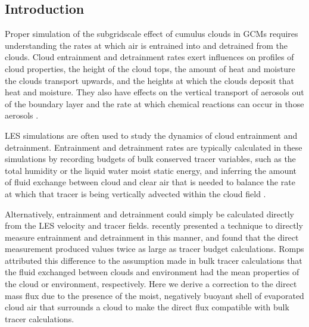 \documentclass[draft,grl]{AGUTeX}
\begin{document}
\begin{article}

%
%

\section{Introduction}

Proper simulation of the subgridscale effect of cumulus clouds in GCMs 
requires understanding the rates at which air is entrained into and detrained 
from the clouds. Cloud entrainment and detrainment rates exert influences on 
profiles of cloud properties, the height of the cloud tops, the amount of heat 
and moisture the clouds transport upwards, and the heights at which the clouds 
deposit that heat and moisture.  They also have effects on the vertical 
transport of aerosols out of the boundary layer and the rate at which 
chemical reactions can occur in those aerosols 
\citep{Barahona2007,Anldrejczuk2008}. 

LES simulations are often used to study the dynamics of cloud entrainment and 
detrainment.  Entrainment and detrainment rates are typically calculated in 
these simulations by recording budgets of bulk conserved tracer variables, such 
as the total humidity or the liquid water moist static energy, and inferring 
the amount of fluid exchange between cloud and clear air that is needed to 
balance the rate at which that tracer is being vertically advected within the 
cloud field \citep{Siebesma1995}.

Alternatively, entrainment and detrainment could simply be calculated directly 
from the LES velocity and tracer fields.  \cite{Romps2010} recently presented 
a technique to directly measure entrainment and detrainment in this manner, 
and found that the direct measurement produced values twice as large as tracer 
budget calculations.  Romps attributed this difference to the assumption made 
in bulk tracer calculations that the fluid exchanged between clouds and 
environment had the mean properties of the cloud or environment, respectively.
Here we derive a correction to the direct mass flux due to the presence of 
the moist, negatively buoyant shell of evaporated cloud air that surrounds a 
cloud to make the direct flux compatible with bulk tracer calculations.



\end{article}
\end{document}
